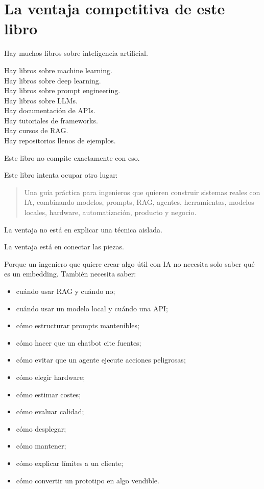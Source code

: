 \section{La ventaja competitiva de este
libro}\label{la-ventaja-competitiva-de-este-libro}

Hay muchos libros sobre inteligencia artificial.

Hay libros sobre machine learning.\\
Hay libros sobre deep learning.\\
Hay libros sobre prompt engineering.\\
Hay libros sobre LLMs.\\
Hay documentación de APIs.\\
Hay tutoriales de frameworks.\\
Hay cursos de RAG.\\
Hay repositorios llenos de ejemplos.

Este libro no compite exactamente con eso.

Este libro intenta ocupar otro lugar:

\begin{quote}
Una guía práctica para ingenieros que quieren construir sistemas reales
con IA, combinando modelos, prompts, RAG, agentes, herramientas, modelos
locales, hardware, automatización, producto y negocio.
\end{quote}

La ventaja no está en explicar una técnica aislada.

La ventaja está en conectar las piezas.

Porque un ingeniero que quiere crear algo útil con IA no necesita solo
saber qué es un embedding. También necesita saber:

\begin{itemize}
\tightlist
\item
  cuándo usar RAG y cuándo no;
\item
  cuándo usar un modelo local y cuándo una API;
\item
  cómo estructurar prompts mantenibles;
\item
  cómo hacer que un chatbot cite fuentes;
\item
  cómo evitar que un agente ejecute acciones peligrosas;
\item
  cómo elegir hardware;
\item
  cómo estimar costes;
\item
  cómo evaluar calidad;
\item
  cómo desplegar;
\item
  cómo mantener;
\item
  cómo explicar límites a un cliente;
\item
  cómo convertir un prototipo en algo vendible.
\end{itemize}

